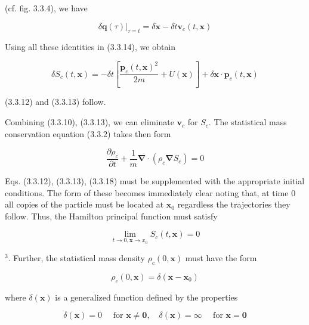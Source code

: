 \documentclass{article}
\begin{document}
(cf. fig. 3.3.4), we have
 
\begin{equation*}
\left.\delta \boldsymbol{q}(\tau)\right|_{\tau=t}=\delta \boldsymbol{x}-\delta t \boldsymbol{v}_{c}(t, \boldsymbol{x}) \tag{3.3.16}
\end{equation*}
 

Using all these identities in (3.3.14), we obtain
 
\begin{equation*}
\delta S_{c}(t, \boldsymbol{x})=-\delta t\left[\frac{\boldsymbol{p}_{c}(t, \boldsymbol{x})^{2}}{2 m}+U(\boldsymbol{x})\right]+\delta \boldsymbol{x} \cdot \boldsymbol{p}_{c}(t, \boldsymbol{x}) \tag{3.3.17}
\end{equation*}
 
(3.3.12) and (3.3.13) follow.

Combining (3.3.10), (3.3.13), we can eliminate $\boldsymbol{v}_{c}$ for $S_{c}$. The statistical mass conservation equation (3.3.2) takes then form
 
\begin{equation*}
\frac{\partial \rho_{c}}{\partial t}+\frac{1}{m} \boldsymbol{\nabla} \cdot\left(\rho_{c} \boldsymbol{\nabla} S_{c}\right)=0 \tag{3.3.18}
\end{equation*}
 

Eqs. (3.3.12), (3.3.13), (3.3.18) must be supplemented with the appropriate initial
conditions. The form of these becomes immediately clear noting that, at time 0 all copies of the particle must be located at $\boldsymbol{x}_{0}$ regardless the trajectories they follow. Thus, the Hamilton principal function must satisfy
 
\begin{equation*}
\lim _{t \rightarrow 0, \boldsymbol{x} \rightarrow x_{0}} S_{c}(t, \boldsymbol{x})=0 \tag{3.3.19}
\end{equation*}
 
${ }^{3}$. Further, the statistical mass density $\rho_{c}(0, \boldsymbol{x})$ must have the form
 
\begin{equation*}
\rho_{c}(0, \boldsymbol{x})=\delta\left(\boldsymbol{x}-\boldsymbol{x}_{0}\right) \tag{3.3.20}
\end{equation*}
 
where $\delta(\boldsymbol{x})$ is a generalized function defined by the properties
 
\begin{equation*}
\delta(\boldsymbol{x})=0 \quad \text { for } \boldsymbol{x} \neq \mathbf{0}, \quad \delta(\boldsymbol{x})=\infty \quad \text { for } \boldsymbol{x}=\mathbf{0} \tag{3.3.21}
\end{equation*}
 
\end{document}
